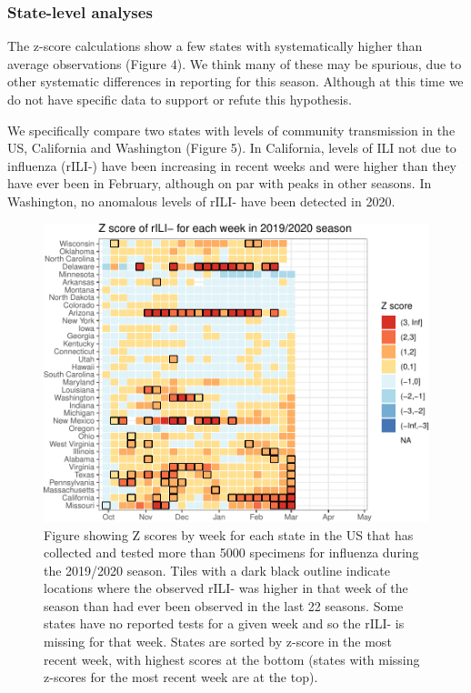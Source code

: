 \documentclass[]{article}
\begin{document}
\hypertarget{state-level-analyses}{%
\subsubsection{State-level analyses}\label{state-level-analyses}}

The z-score calculations show a few states with systematically higher
than average observations (Figure 4). We think many of these may be
spurious, due to other systematic differences in reporting for this
season. Although at this time we do not have specific data to support or
refute this hypothesis.

We specifically compare two states with levels of community transmission
in the US, California and Washington (Figure 5). In California, levels
of ILI not due to influenza (rILI-) have been increasing in recent weeks
and were higher than they have ever been in February, although on par
with peaks in other seasons. In Washington, no anomalous levels of rILI-
have been detected in 2020.

\begin{figure}
\centering
\includegraphics{ili-labtest-report_files/figure-latex/calc-avg-sd-all-states-1.pdf}
\caption{Figure showing Z scores by week for each state in the US that
has collected and tested more than 5000 specimens for influenza during
the 2019/2020 season. Tiles with a dark black outline indicate locations
where the observed rILI- was higher in that week of the season than had
ever been observed in the last 22 seasons. Some states have no reported
tests for a given week and so the rILI- is missing for that week. States
are sorted by z-score in the most recent week, with highest scores at
the bottom (states with missing z-scores for the most recent week are at
the top).}
\end{figure}
\end{document}
